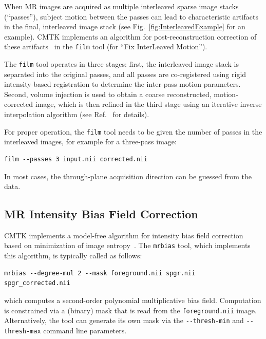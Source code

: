 \documentclass{InsightArticle}
\begin{document}
When MR images are acquired as multiple interleaved sparse image stacks
(``passes''), subject motion between the passes can lead to characteristic
artifacts in the final, interleaved image stack (see
Fig.~\ref{fig:InterleavedExample} for an example). CMTK implements an
algorithm for post-reconstruction correction of these
artifacts~\cite{RohlRadePfef:2008a} in the \verb|film| tool (for ``Fix
InterLeaved Motion'').

The \verb|film| tool operates in three stages: first, the interleaved image
stack is separated into the original passes, and all passes are co-registered
using rigid intensity-based registration to determine the inter-pass motion
parameters. Second, volume injection is used to obtain a coarse reconstructed,
motion-corrected image, which is then refined in the third stage using an
iterative inverse interpolation algorithm (see Ref.~\cite{RohlRadePfef:2008a}
for details).

For proper operation, the \verb|film| tool needs to be given the number of
passes in the interleaved images, for example for a three-pass image:
\begin{verbatim}
film --passes 3 input.nii corrected.nii
\end{verbatim}
In most cases, the through-plane acquisition direction can be guessed from the
data.

\subsection{MR Intensity Bias Field Correction}

CMTK implements a model-free algorithm for intensity bias field correction
based on minimization of image entropy~\cite{LikaVierPern:2001}. The
\verb|mrbias| tool, which implements this algorithm, is typically called as
follows:
\begin{verbatim}
mrbias --degree-mul 2 --mask foreground.nii spgr.nii spgr_corrected.nii
\end{verbatim}
which computes a second-order polynomial multiplicative bias
field. Computation is constrained via a (binary) mask that is read from the
\verb|foreground.nii| image. Alternatively, the tool can generate its own mask
via the \verb|--thresh-min| and  \verb|--thresh-max| command line parameters.
\end{document}
